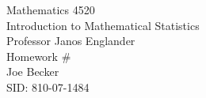 \begin{titlepage}
\setlength{\topmargin}{1.5in}
\begin{center}
\Huge{Mathematics 4520} \\
\LARGE{Introduction to Mathematical Statistics} \\
\Large{Professor Janos Englander} \\[1cm]

\huge{Homework \#\HWnum}\\[0.5cm]

\large{Joe Becker} \\
\large{SID: 810-07-1484} \\
\large{\due} 

\end{center}

\end{titlepage}

